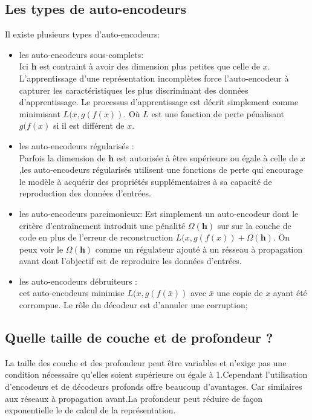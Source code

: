 \documentclass[12pt,a4paper]{report}
\begin{document}
\subsection{Les types de auto-encodeurs }
Il existe plusieurs types d'auto-encodeurs: 
\begin{itemize}[label=\textbullet, font=\LARGE \color{blue}]
\item les auto-encodeurs sous-complets:  \\
Ici $\textbf{h}$ est contraint à avoir des dimension plus petites que celle de $x$. L'apprentissage d'une représentation incomplètes force l'auto-encodeur à capturer les caractéristiques les plus discriminant des données d'apprentissage. Le processus d'apprentissage est décrit simplement comme minimisant $L(x,g(f (x) )$. Où $L$ est une fonction de perte pénalisant $g(f (x) $  si il est différent de $x$.

\item les auto-encodeurs régularisés :  \\
Parfois la dimension de $\textbf{h}$  est autorisée à être supérieure ou égale à celle de $x$,les auto-encodeurs régularisés utilisent une fonctions de perte qui encourage le modèle  à  acquérir des propriétés supplémentaires à sa capacité de reproduction des données d'entrées.
\item les auto-encodeurs parcimonieux: 
Est simplement un auto-encodeur dont le critère d’entraînement introduit une pénalité $	\Omega(\textbf{h})$ sur sur la couche de code en plus de l'erreur de reconstruction $L(x,g(f (x) )+ \Omega(\textbf{h})$. On peux voir le  $ 	\Omega(\textbf{h})$  comme un régulateur ajouté à un  résseau à propagation avant dont l'objectif est de reproduire les données d'entrées.

\item les auto-encodeurs débruiteurs :  \\
cet auto-encodeurs minimise $L(x,g(f (\bar {x}) )$ avec $\bar {x}$ une copie de $x$ ayant été corrompue. Le rôle du décodeur est d'annuler une corruption;\\


\end{itemize}

\subsection{Quelle taille de couche et de profondeur ? }
La taille des couche et des profondeur peut être variables et n'exige pas une condition nécessaire qu'elles soient supérieure ou égale à 1.Cependant l'utilisation d'encodeurs et de décodeurs profonds offre beaucoup d'avantages. Car  similaires aux réseaux à propagation avant.La profondeur peut réduire de façon exponentielle le de calcul de la représentation.
\end{document}
